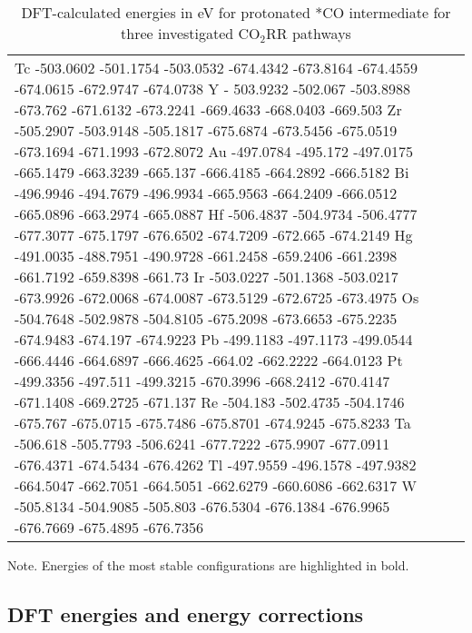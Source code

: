 \begin{table}[h]
\begin{tabular}{lr}
      Tc	-503.0602	-501.1754	-503.0532	-674.4342	-673.8164	-674.4559	-674.0615	-672.9747	-674.0738
      Y	- 503.9232	-502.067	-503.8988	-673.762	-671.6132	-673.2241	-669.4633	-668.0403	-669.503
      Zr	-505.2907	-503.9148	-505.1817	-675.6874	-673.5456	-675.0519	-673.1694	-671.1993	-672.8072
      Au	-497.0784	-495.172	-497.0175	-665.1479	-663.3239	-665.137	-666.4185	-664.2892	-666.5182
      Bi	-496.9946	-494.7679	-496.9934	-665.9563	-664.2409	-666.0512	-665.0896	-663.2974	-665.0887
      Hf	-506.4837	-504.9734	-506.4777	-677.3077	-675.1797	-676.6502	-674.7209	-672.665	-674.2149
      Hg	-491.0035	-488.7951	-490.9728	-661.2458	-659.2406	-661.2398	-661.7192	-659.8398	-661.73
      Ir	-503.0227	-501.1368	-503.0217	-673.9926	-672.0068	-674.0087	-673.5129	-672.6725	-673.4975
      Os	-504.7648	-502.9878	-504.8105	-675.2098	-673.6653	-675.2235	-674.9483	-674.197	-674.9223
      Pb	-499.1183	-497.1173	-499.0544	-666.4446	-664.6897	-666.4625	-664.02 	-662.2222	-664.0123
      Pt	-499.3356	-497.511	-499.3215	-670.3996	-668.2412	-670.4147	-671.1408	-669.2725	-671.137
      Re	-504.183	-502.4735	-504.1746	-675.767	-675.0715	-675.7486	-675.8701	-674.9245	-675.8233
      Ta	-506.618	-505.7793	-506.6241	-677.7222	-675.9907	-677.0911	-676.4371	-674.5434	-676.4262
      Tl	-497.9559	-496.1578	-497.9382	-664.5047	-662.7051	-664.5051	-662.6279	-660.6086	-662.6317
      W	  -505.8134	-504.9085	-505.803	-676.5304	-676.1384	-676.9965	-676.7669	-675.4895	-676.7356
      \hline
    \end{tabular}
    \caption{DFT-calculated energies in eV for protonated *CO intermediate for three investigated CO$_2$RR pathways}
    \label{si_table1}
\end{table}

Note. Energies of the most stable configurations are highlighted in bold.


\subsection{DFT energies and energy corrections}


